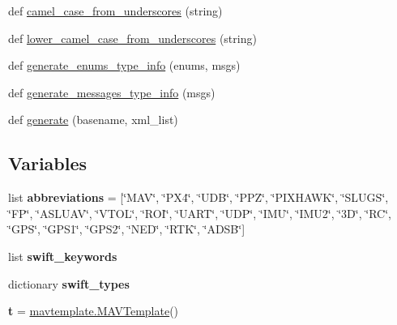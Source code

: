 \begin{DoxyCompactItemize}
\item 
def \hyperlink{namespacepymavlink_1_1generator_1_1mavgen__swift_a3be145e5779805512d208e0a874649f5}{camel\+\_\+case\+\_\+from\+\_\+underscores} (string)
\item 
def \hyperlink{namespacepymavlink_1_1generator_1_1mavgen__swift_a760d6a0be86d0a7a913f3294776c9032}{lower\+\_\+camel\+\_\+case\+\_\+from\+\_\+underscores} (string)
\item 
def \hyperlink{namespacepymavlink_1_1generator_1_1mavgen__swift_afb69b33604ef3c1f420f5765fba3a6f3}{generate\+\_\+enums\+\_\+type\+\_\+info} (enums, msgs)
\item 
def \hyperlink{namespacepymavlink_1_1generator_1_1mavgen__swift_ab22d92a382854b7dfe92145f9efc184a}{generate\+\_\+messages\+\_\+type\+\_\+info} (msgs)
\item 
def \hyperlink{namespacepymavlink_1_1generator_1_1mavgen__swift_a0435c038175b5fff7394838ccebd9c64}{generate} (basename, xml\+\_\+list)
\end{DoxyCompactItemize}
\subsection*{Variables}
\begin{DoxyCompactItemize}
\item 
\mbox{\label{namespacepymavlink_1_1generator_1_1mavgen__swift_a7d48550252b4b1e2355d537407feb187}} 
list {\bfseries abbreviations} = \mbox{[}\char`\"{}M\+AV\char`\"{}, \char`\"{}P\+X4\char`\"{}, \char`\"{}U\+DB\char`\"{}, \char`\"{}P\+PZ\char`\"{}, \char`\"{}P\+I\+X\+H\+A\+WK\char`\"{}, \char`\"{}S\+L\+U\+GS\char`\"{}, \char`\"{}FP\char`\"{}, \char`\"{}A\+S\+L\+U\+AV\char`\"{}, \char`\"{}V\+T\+OL\char`\"{}, \char`\"{}R\+OI\char`\"{}, \char`\"{}U\+A\+RT\char`\"{}, \char`\"{}U\+DP\char`\"{}, \char`\"{}I\+MU\char`\"{}, \char`\"{}I\+M\+U2\char`\"{}, \char`\"{}3\+D\char`\"{}, \char`\"{}\+R\+C\char`\"{}, \char`\"{}\+G\+P\+S\char`\"{}, \char`\"{}\+G\+P\+S1\char`\"{}, \char`\"{}\+G\+P\+S2\char`\"{}, \char`\"{}\+N\+E\+D\char`\"{}, \char`\"{}\+R\+T\+K\char`\"{}, \char`\"{}\+A\+D\+S\+B\char`\"{}\mbox{]}
\item 
list {\bfseries swift\+\_\+keywords}
\item 
dictionary {\bfseries swift\+\_\+types}
\item 
\mbox{\label{namespacepymavlink_1_1generator_1_1mavgen__swift_aac7fb2c7851d03726e4b15fd2304711d}} 
{\bfseries t} = \hyperlink{classpymavlink_1_1generator_1_1mavtemplate_1_1MAVTemplate}{mavtemplate.\+M\+A\+V\+Template}()
\end{DoxyCompactItemize}


